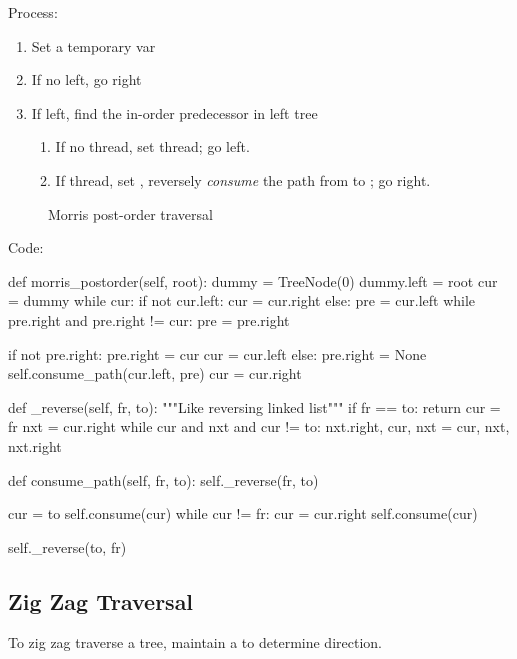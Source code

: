 Process:
\begin{enumerate}
\item Set a temporary var 
\item If no left, go right
\item If left, find the in-order predecessor  in left tree
\begin{enumerate}
\item If no thread, set  thread; go left.
\item If thread,  set , reversely \textit{consume} the path from  to ; go right.
\end{enumerate}
\end{enumerate}
\begin{figure*}[!htb]
\centering
{}
\caption{Morris post-order traversal}
\label{fig:morrisInorder}
\end{figure*}
Code:
\begin{python}
def morris_postorder(self, root):
    dummy = TreeNode(0)
    dummy.left = root
    cur = dummy
    while cur:
        if not cur.left:
            cur = cur.right
        else:
            pre = cur.left
            while pre.right and pre.right != cur:
                pre = pre.right

            if not pre.right:
                pre.right = cur
                cur = cur.left
            else:
                pre.right = None
                self.consume_path(cur.left, pre)
                cur = cur.right

def _reverse(self, fr, to):
    """Like reversing linked list"""
    if fr == to: return
    cur = fr
    nxt = cur.right
    while cur and nxt and cur != to:
        nxt.right, cur, nxt = cur, nxt, nxt.right

def consume_path(self, fr, to):
    self._reverse(fr, to)

    cur = to
    self.consume(cur)
    while cur != fr:
        cur = cur.right
        self.consume(cur)

    self._reverse(to, fr)
\end{python}

\subsection{Zig Zag Traversal}
To zig zag traverse a tree, maintain a  to determine direction. 

